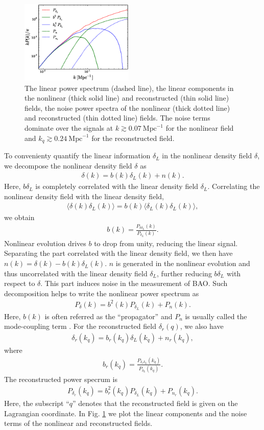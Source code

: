 \documentclass[aps,prd,twocolumn,showpacs,superscriptaddress,groupedaddress,nofootinbib]{revtex4}  %
\newcommand{\mr}{\mathrm}
\newcommand{\bea}{\begin{eqnarray}}
\newcommand{\eea}{\end{eqnarray}}
\begin{document}
\begin{figure}[tbp]
\begin{center}
\includegraphics[width=0.48\textwidth]{f3xx.eps}
\end{center}
\vspace{-0.7cm}
\caption{The linear power spectrum (dashed line), the linear components in the
nonlinear (thick solid line) and reconstructed (thin solid line) fields,
the noise power spectra of the nonlinear (thick dotted line) and reconstructed
(thin dotted line) fields. The noise terms dominate over the signals at 
$k\gtrsim0.07\ \mr{Mpc}^{-1}$ for the nonlinear field and $k_q\gtrsim0.24\ \mr{Mpc}^{-1}$
for the reconstructed field.}
\label{fig:pn}
\end{figure}

To convenienty quantify the linear information $\delta_L$ in 
the nonlinear density field $\delta$, we decompose the nonlinear density field
$\delta$ as
\begin{eqnarray}
\delta({k})=b({k})\delta_L({k})+n({k}).
\end{eqnarray}
Here, $b\delta_L$ is completely correlated with the linear density field 
$\delta_L$. Correlating the nonlinear density field with the linear density 
field,  
\bea
\langle\delta(k)\delta_L(k)\rangle=b(k)\langle\delta_L(k)\delta_L(k)\rangle,
\eea
we obtain 
\bea
b(k)=\frac{P_{\delta\delta_L}(k)}{P_{\delta_L}(k)}.
\eea
Nonlinear evolution drives $b$ to drop from unity, reducing the linear signal.
Separating the part correlated with the linear density field, we then have
$n(k)=\delta(k)-b(k)\delta_L(k)$.
$n$ is generated in the nonlinear evolution and thus uncorrelated with
the linear density field $\delta_L$, further reducing $b\delta_L$ with respect
to $\delta$. This part induces noise in the measurement of BAO. 
Such decomposition helps to write the nonlinear power spectrum as
\bea
P_\delta(k)=b^2(k)P_{\delta_L}(k)+P_{n}(k).
\eea
Here, $b(k)$ is often referred as the ``propagator'' and $P_{n}$ is usually
called the mode-coupling term \cite{2006crocce,2008crocce,2008matsubara}.
For the reconstructed field $\delta_r(q)$, we also have
\bea
\delta_r(k_q)=b_r(k_q)\delta_L(k_q)+n_r(k_q),
\eea
where 
\bea
b_r(k_q)=\frac{P_{\delta_r\delta_L}(k_q)}{P_{\delta_L}(k_q)}.
\eea
The reconstructed power specrum is 
\bea
P_{\delta_r}(k_q)=b_r^2(k_q)P_{\delta_L}(k_q)+P_{n_r}(k_q).
\eea
Here, the subscript ``$q$'' denotes that the reconstructed field is given on the
Lagrangian coordinate.
In Fig. \ref{fig:pn} we plot the linear components and the noise terms of
the nonlinear and reconstructed fields.
\end{document}
